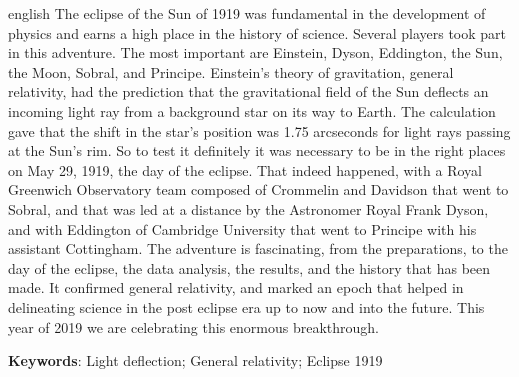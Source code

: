 \begin{resumo}[Abstract]
    \begin{otherlanguage*}{english}
        The eclipse of the Sun of 1919 was fundamental in the development of physics and earns a high place in the history of science. Several players took part in this adventure. The most important are Einstein, Dyson, Eddington, the Sun, the Moon, Sobral, and Principe. Einstein's theory of gravitation, general relativity, had the prediction that the gravitational field of the Sun deflects an incoming light ray from a background star on its way to Earth. The calculation gave that the shift in the star's position was 1.75 arcseconds for light rays passing at the Sun's rim. So to test it definitely it was necessary to be in the right places on May 29, 1919, the day of the eclipse. That indeed happened, with a Royal Greenwich Observatory team composed of Crommelin and Davidson that went to Sobral, and that was led at a distance by the Astronomer Royal Frank Dyson, and with Eddington of Cambridge University that went to Principe with his assistant Cottingham. The adventure is fascinating, from the preparations, to the day of the eclipse, the data analysis, the results, and the history that has been made. It confirmed general relativity, and marked an epoch that helped in delineating science in the post eclipse era up to now and into the future. This year of 2019 we are celebrating this enormous breakthrough.
   
   
        \vspace{\onelineskip}
        \noindent 
       
        \textbf{Keywords}: Light deflection; General relativity; Eclipse 1919
    \end{otherlanguage*}
\end{resumo}
